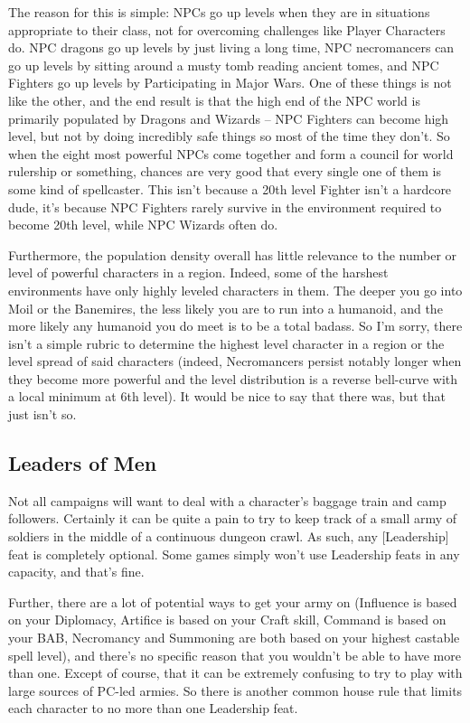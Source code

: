 The reason for this is simple: NPCs go up levels when they are in situations appropriate to their class, not for overcoming challenges like Player Characters do. NPC dragons go up levels by just living a long time, NPC necromancers can go up levels by sitting around a musty tomb reading ancient tomes, and NPC Fighters go up levels by Participating in Major Wars. One of these things is not like the other, and the end result is that the high end of the NPC world is primarily populated by Dragons and Wizards -- NPC Fighters can become high level, but not by doing incredibly safe things so most of the time they don't. So when the eight most powerful NPCs come together and form a council for world rulership or something, chances are very good that every single one of them is some kind of spellcaster. This isn't because a 20th level Fighter isn't a hardcore dude, it's because NPC Fighters rarely survive in the environment required to become 20th level, while NPC Wizards often do.

Furthermore, the population density overall has little relevance to the number or level of powerful characters in a region. Indeed, some of the harshest environments have only highly leveled characters in them. The deeper you go into Moil or the Banemires, the less likely you are to run into a humanoid, and the more likely any humanoid you do meet is to be a total badass. So I'm sorry, there isn't a simple rubric to determine the highest level character in a region or the level spread of said characters (indeed, Necromancers persist notably longer when they become more powerful and the level distribution is a reverse bell-curve with a local minimum at 6th level). It would be nice to say that there was, but that just isn't so.

\subsection{Leaders of Men}
\vspace*{-8pt}

Not all campaigns will want to deal with a character's baggage train and camp followers. Certainly it can be quite a pain to try to keep track of a small army of soldiers in the middle of a continuous dungeon crawl. As such, any [Leadership] feat is completely optional. Some games simply won't use Leadership feats in any capacity, and that's fine.

Further, there are a lot of potential ways to get your army on (Influence is based on your Diplomacy, Artifice is based on your Craft skill, Command is based on your BAB, Necromancy and Summoning are both based on your highest castable spell level), and there's no specific reason that you wouldn't be able to have more than one. Except of course, that it can be extremely confusing to try to play with large sources of PC-led armies. So there is another common house rule that limits each character to no more than one Leadership feat.

